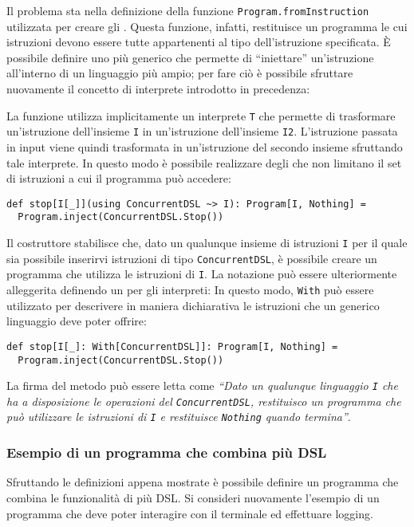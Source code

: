 Il problema sta nella definizione della funzione \lstinline{Program.fromInstruction} utilizzata per creare gli . Questa funzione, infatti, restituisce un programma le cui istruzioni devono essere tutte appartenenti al tipo dell'istruzione specificata. È possibile definire uno  più generico che permette di ``iniettare'' un'istruzione all'interno di un linguaggio più ampio; per fare ciò è possibile sfruttare nuovamente il concetto di interprete introdotto in precedenza:

La funzione utilizza implicitamente un interprete \lstinline{T} che permette di trasformare un'istruzione dell'insieme \lstinline{I} in un'istruzione dell'insieme \lstinline{I2}. L'istruzione passata in input viene quindi trasformata in un'istruzione del secondo insieme sfruttando tale interprete.
In questo modo è possibile realizzare degli  che non limitano il set di istruzioni a cui il programma può accedere:
\begin{lstlisting}[language=scala3]
def stop[I[_]](using ConcurrentDSL ~> I): Program[I, Nothing] =
  Program.inject(ConcurrentDSL.Stop())
\end{lstlisting}
Il costruttore stabilisce che, dato un qualunque insieme di istruzioni \lstinline{I} per il quale sia possibile inserirvi istruzioni di tipo \lstinline{ConcurrentDSL}, è possibile creare un programma che utilizza le istruzioni di \lstinline{I}.
La notazione può essere ulteriormente alleggerita definendo un  per gli interpreti:
In questo modo, \lstinline{With} può essere utilizzato per descrivere in maniera dichiarativa le istruzioni che un generico linguaggio deve poter offrire:
\begin{lstlisting}[language=scala3]
def stop[I[_]: With[ConcurrentDSL]]: Program[I, Nothing] =
  Program.inject(ConcurrentDSL.Stop())
\end{lstlisting}
La firma del metodo può essere letta come \emph{``Dato un qualunque linguaggio \lstinline{I} che ha a disposizione le operazioni del \lstinline{ConcurrentDSL}, restituisco un programma che può utilizzare le istruzioni di \lstinline{I} e restituisce \lstinline{Nothing} quando termina''}.

\subsubsection{Esempio di un programma che combina più DSL}
Sfruttando le definizioni appena mostrate è possibile definire un programma che combina le funzionalità di più DSL. Si consideri nuovamente l'esempio di un programma che deve poter interagire con il terminale ed effettuare logging.

